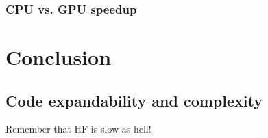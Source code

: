 \documentclass[final,3p,times,twocolumn]{elsarticle}
\begin{document}
	\subsubsection{CPU vs. GPU speedup}
	
	\newpage
	\section{Conclusion}
	\label{sec:conclusion}
	
	\subsection{Code expandability and complexity}
	Remember that HF is slow as hell!
	
	
	
	
	
	
	\appendix
\end{document}
